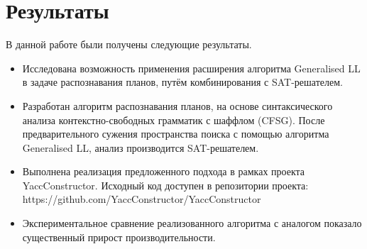 \documentclass[14pt]{matmex-diploma-custom}
\begin{document}
    \section{Результаты}
    В данной работе были получены следующие результаты.
    
    \begin{itemize}
    	\item Исследована возможность применения расширения алгоритма Generalised LL
    	      в задаче распознавания планов, путём комбинирования с SAT-решателем.
        \item Разработан алгоритм распознавания планов, на основе синтаксического анализа контекстно-свободных грамматик с шаффлом (CFSG).
              После предварительного сужения пространства поиска с помощью алгоритма Generalised LL, анализ производится SAT-решателем.
        \item Выполнена реализация предложенного подхода в рамках проекта YaccConstructor. Исходный код доступен
        в репозитории проекта: https://github.com/YaccConstructor/YaccConstructor
        \item Экспериментальное сравнение реализованного алгоритма с аналогом показало существенный прирост производительности. 
    \end{itemize}
    
   	\setmonofont[Mapping=tex-text]{CMU Typewriter Text}
    
    
\end{document}
